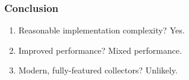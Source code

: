 \begin{frame}
    \frametitle{Conclusion}
    \begin{enumerate}
        \item Reasonable implementation complexity? Yes.
        \item Improved performance? Mixed performance.
        \item Modern, fully-featured collectors? Unlikely.
    \end{enumerate}
\end{frame}
